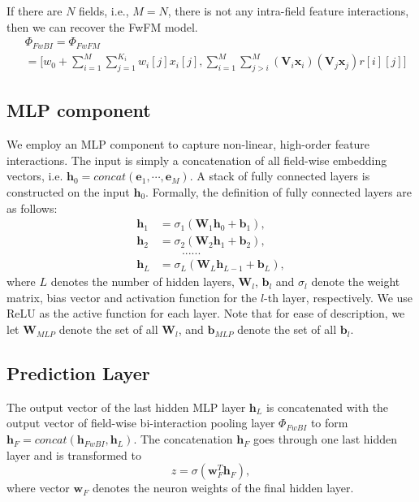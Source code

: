 \documentclass[sigconf]{acmart}
\begin{document}
If there are $N$ fields, i.e., $M=N$, there is not any intra-field feature interactions, then we can recover the FwFM model.
\begin{equation}\label{eq:fwfm}
\begin{split}
&	\Phi_{FwBI}=\Phi_{FwFM}\\
&=\Big[w_0 + \sum_{i=1}^{M}\sum_{j=1}^{K_i} w_{i}[j] x_{i}[j], \sum_{i=1}^M\sum_{j>i}^M(\mathbf{V}_i\mathbf{x}_i)(\mathbf{V}_j\mathbf{x}_j)r[i][j]\Big]
\end{split}
\end{equation}  







\subsection{MLP component}\label{sec:MLP}
We employ an MLP component to capture non-linear, high-order feature interactions. 
The input is simply a concatenation of all field-wise embedding vectors, i.e. $\mathbf{h}_0=concat(\mathbf{e}_1,\cdots,\mathbf{e}_M)$. 
A stack of fully connected layers is constructed on the input $\mathbf{h}_0$. 
Formally, the definition of fully connected layers are as follows:
\begin{equation}
\begin{aligned}
	\mathbf{h}_1 &= \sigma_1 (\textbf{W}_1 \mathbf{h}_0 + \textbf{b}_1 ), \\
	\mathbf{h}_2 &= \sigma_2 (\textbf{W}_2 \mathbf{h}_1 + \textbf{b}_2), \\
	&\quad\quad ... ... \\
	\mathbf{h}_L &= \sigma_L (\textbf{W}_L \mathbf{h}_{L-1} + \textbf{b}_L),
\end{aligned}
\end{equation}
where $L$ denotes the number of hidden layers, $\textbf{W}_l$, $\textbf{b}_l$ and $\sigma_l$ denote the weight matrix, bias vector and activation function for the $l$-th layer, respectively. We use ReLU as the active function for each layer. Note that for ease of description, we let $\mathbf{W}_{MLP}$ denote the set of all $\textbf{W}_l$, and $\mathbf{b}_{MLP}$ denote the set of all $\textbf{b}_l$.

\subsection{Prediction Layer}\label{sec:prediction}

The output vector of the last hidden MLP layer $\textbf{h}_L$ is concatenated with the output vector of field-wise bi-interaction pooling layer $\Phi_{FwBI}$ to form $\mathbf{h}_F = concat(\mathbf{h}_{FwBI},\mathbf{h}_L)$. 
The concatenation $\mathbf{h}_F$ goes through one last hidden layer and is transformed to 
\begin{equation}
	z = \sigma(\mathbf{w}^T_F \mathbf{h}_F), 
\end{equation}
where vector $\mathbf{w}_F$ denotes the neuron weights of the final hidden layer. 
\end{document}
